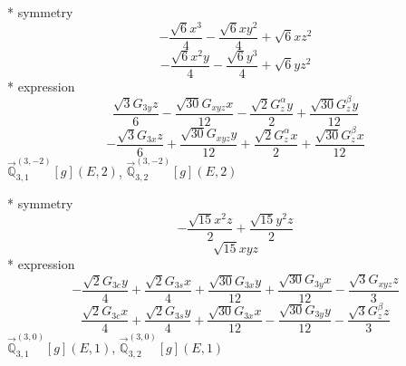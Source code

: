 \documentclass[fleqn,8pt]{jsarticle}
\begin{document}
\noindent\quad ** symmetry
\begin{dmath*}
- \frac{\sqrt{6} x^{3}}{4} - \frac{\sqrt{6} x y^{2}}{4} + \sqrt{6} x z^{2}
\end{dmath*}
\begin{dmath*}
- \frac{\sqrt{6} x^{2} y}{4} - \frac{\sqrt{6} y^{3}}{4} + \sqrt{6} y z^{2}
\end{dmath*}
\noindent\quad ** expression
\begin{dmath*}
\frac{\sqrt{3} G_{3y} z}{6} - \frac{\sqrt{30} G_{xyz} x}{12} - \frac{\sqrt{2} G_{z}^{\alpha} y}{2} + \frac{\sqrt{30} G_{z}^{\beta} y}{12}
\end{dmath*}
\begin{dmath*}
- \frac{\sqrt{3} G_{3x} z}{6} + \frac{\sqrt{30} G_{xyz} y}{12} + \frac{\sqrt{2} G_{z}^{\alpha} x}{2} + \frac{\sqrt{30} G_{z}^{\beta} x}{12}
\end{dmath*}
\noindent\quad $\vec{\mathbb{Q}}_{3,1}^{(3,-2)}[g](E,2)$, $\vec{\mathbb{Q}}_{3,2}^{(3,-2)}[g](E,2)$

\noindent\quad ** symmetry
\begin{dmath*}
- \frac{\sqrt{15} x^{2} z}{2} + \frac{\sqrt{15} y^{2} z}{2}
\end{dmath*}
\begin{dmath*}
\sqrt{15} x y z
\end{dmath*}
\noindent\quad ** expression
\begin{dmath*}
- \frac{\sqrt{2} G_{3c} y}{4} + \frac{\sqrt{2} G_{3s} x}{4} + \frac{\sqrt{30} G_{3x} y}{12} + \frac{\sqrt{30} G_{3y} x}{12} - \frac{\sqrt{3} G_{xyz} z}{3}
\end{dmath*}
\begin{dmath*}
\frac{\sqrt{2} G_{3c} x}{4} + \frac{\sqrt{2} G_{3s} y}{4} + \frac{\sqrt{30} G_{3x} x}{12} - \frac{\sqrt{30} G_{3y} y}{12} - \frac{\sqrt{3} G_{z}^{\beta} z}{3}
\end{dmath*}
\noindent\quad $\vec{\mathbb{Q}}_{3,1}^{(3,0)}[g](E,1)$, $\vec{\mathbb{Q}}_{3,2}^{(3,0)}[g](E,1)$
\end{document}
